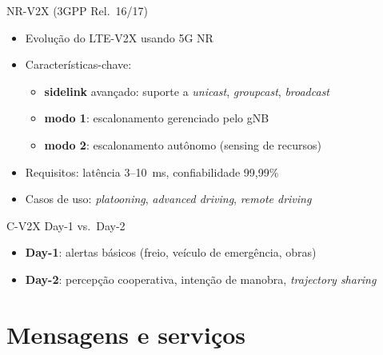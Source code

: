 \documentclass[aspectratio=169,11pt]{beamer}
\begin{document}
\begin{frame}{NR-V2X (3GPP Rel.\ 16/17)}
  \begin{itemize}
    \item Evolução do LTE-V2X usando 5G NR
    \item Características-chave:
      \begin{itemize}
        \item \textbf{sidelink} avançado: suporte a \emph{unicast}, \emph{groupcast}, \emph{broadcast}
        \item \textbf{modo 1}: escalonamento gerenciado pelo gNB
        \item \textbf{modo 2}: escalonamento autônomo (sensing de recursos)
      \end{itemize}
    \item Requisitos: latência 3--10~ms, confiabilidade 99,99\%
    \item Casos de uso: \emph{platooning}, \emph{advanced driving}, \emph{remote driving}
  \end{itemize}
  \begin{block}{C-V2X Day-1 vs.\ Day-2}
    \begin{itemize}
      \item \textbf{Day-1}: alertas básicos (freio, veículo de emergência, obras)
      \item \textbf{Day-2}: percepção cooperativa, intenção de manobra, \emph{trajectory sharing}
    \end{itemize}
  \end{block}
\end{frame}

\section{Mensagens e serviços}
\end{document}
